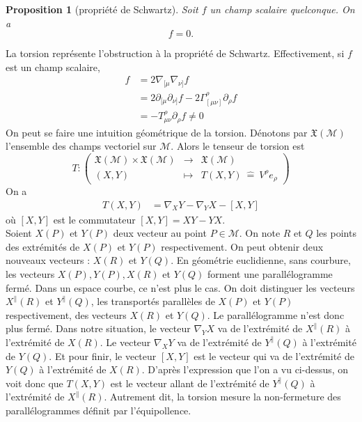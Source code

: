\documentclass[a4paper,11pt]{report}
\theoremstyle{definition}
\theoremstyle{plain}
\newtheorem{prop}[thm]{Proposition}
\theoremstyle{definition}
\theoremstyle{remark}
\newcommand{\M}{\mathscr{M}}
\newcommand{\p}{\partial}
\begin{document}
                \begin{prop}[propriété de Schwartz]
                    Soit $f$ un champ scalaire quelconque. On a
                    \begin{equation}
                        [\p_\mu,\p_\nu]f = 0.
                    \end{equation}
                \end{prop}
                
                La torsion représente l'obstruction à la propriété de Schwartz. Effectivement, si $f$ est un champ scalaire,
                \begin{align}
                    [\nabla_\mu,\nabla_\nu]f &= 2\nabla_{[\mu}\nabla_{\nu]}f\\
                    &= 2\p_{[\mu}\p_{\nu]}f-2\Gamma^\rho_{[\mu\nu]}\p_\rho f\\
                    &= -T^\rho_{\mu\nu}\p_\rho f\neq 0
                \end{align}
                On peut se faire une intuition géométrique de la torsion. Dénotons par $\mathfrak{X}(\M)$ l'ensemble des champs vectoriel sur $\M$. Alors le tenseur de torsion est
                \begin{equation}
                T:\left(
                \begin{array}{ccc}
                    \mathfrak{X}(\M)\times \mathfrak{X}(\M) & \longrightarrow & \mathfrak{X}(\M)\\
                    (X,Y) & \longmapsto & T(X,Y)~\hat{=}~V^\rho e_\rho
                \end{array}
                \right)
                \end{equation}
                On a 
                \begin{align}
                    T(X,Y) &= \nabla_X Y - \nabla_Y X - [X,Y]
                \end{align}
                où $[X,Y]$ est le commutateur $[X,Y] = XY-YX$.\\
                
                Soient $X(P)$ et $Y(P)$ deux vecteur au point $P\in \M$. On note $R$ et $Q$ les points des extrémités de $X(P)$ et $Y(P)$ respectivement. On peut obtenir deux nouveaux vecteurs : $X(R)$ et $Y(Q)$. En géométrie euclidienne, sans courbure, les vecteurs $X(P),Y(P),X(R)$ et $Y(Q)$ forment une parallélogramme fermé. Dans un espace courbe, ce n'est plus le cas. On doit distinguer les vecteurs $X^\parallel(R)$ et $Y^\parallel(Q)$, les transportés parallèles de $X(P)$ et $Y(P)$ respectivement, des vecteurs $X(R)$ et $Y(Q)$. Le parallélogramme n'est donc plus fermé. Dans notre situation, le vecteur $\nabla_Y X$ va de l'extrémité de $X^\parallel(R)$ à l'extrémité de $X(R)$. Le vecteur $\nabla_X Y$ va de l'extrémité de $Y^\parallel(Q)$ à l'extrémité de $Y(Q)$. Et pour finir, le vecteur $[X,Y]$ est le vecteur qui va de l'extrémité de $Y(Q)$ à l'extrémité de $X(R)$. D'après l'expression que l'on a vu ci-dessus, on voit donc que $T(X,Y)$ est le vecteur allant de l'extrémité de $Y^\parallel(Q)$ à l'extrémité de $X^\parallel(R)$. Autrement dit, la torsion mesure la non-fermeture des parallélogrammes définit par l'équipollence.\\
                
\end{document}

